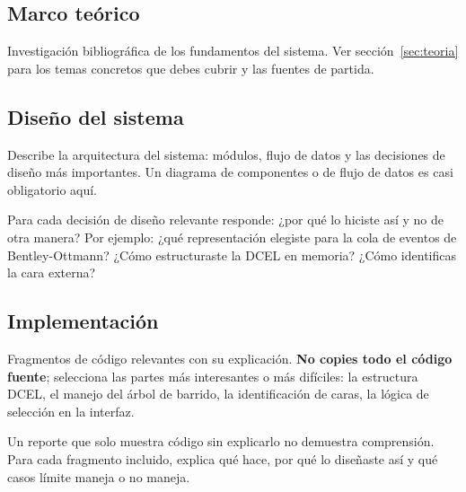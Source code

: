 \documentclass[12pt, oneside]{article}
\begin{document}
\subsection{Marco teórico}

Investigación bibliográfica de los fundamentos del sistema.
Ver sección~\ref{sec:teoria} para los temas concretos que debes cubrir
y las fuentes de partida.

\subsection{Diseño del sistema}

Describe la arquitectura del sistema: módulos, flujo de datos y las
decisiones de diseño más importantes.  Un diagrama de componentes o de
flujo de datos es casi obligatorio aquí.

Para cada decisión de diseño relevante responde: ¿por qué lo hiciste
así y no de otra manera?  Por ejemplo: ¿qué representación elegiste
para la cola de eventos de Bentley-Ottmann?  ¿Cómo estructuraste la
DCEL en memoria?  ¿Cómo identificas la cara externa?

\subsection{Implementación}

Fragmentos de código relevantes con su explicación.  \textbf{No copies
todo el código fuente}; selecciona las partes más interesantes o más
difíciles: la estructura DCEL, el manejo del árbol de barrido, la
identificación de caras, la lógica de selección en la interfaz.

\begin{advertencia}
  Un reporte que solo muestra código sin explicarlo no demuestra
  comprensión.  Para cada fragmento incluido, explica qué hace,
  por qué lo diseñaste así y qué casos límite maneja o no maneja.
\end{advertencia}

\end{document}
